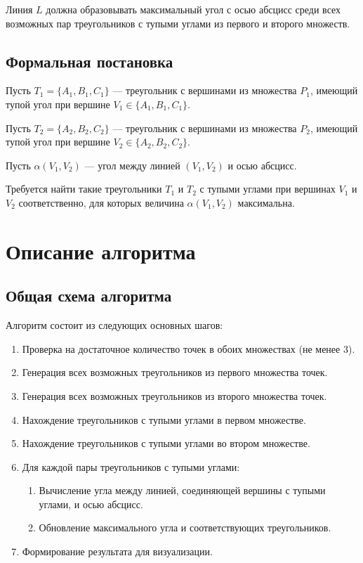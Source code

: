 \documentclass[a4paper,12pt]{article}
\begin{document}
Линия $L$ должна образовывать максимальный угол с осью абсцисс среди всех возможных пар треугольников с тупыми углами из первого и второго множеств.

\subsection{Формальная постановка}
Пусть $T_1 = \{A_1, B_1, C_1\}$ — треугольник с вершинами из множества $P_1$, имеющий тупой угол при вершине $V_1 \in \{A_1, B_1, C_1\}$.

Пусть $T_2 = \{A_2, B_2, C_2\}$ — треугольник с вершинами из множества $P_2$, имеющий тупой угол при вершине $V_2 \in \{A_2, B_2, C_2\}$.

Пусть $\alpha(V_1, V_2)$ — угол между линией $(V_1, V_2)$ и осью абсцисс.

Требуется найти такие треугольники $T_1$ и $T_2$ с тупыми углами при вершинах $V_1$ и $V_2$ соответственно, для которых величина $\alpha(V_1, V_2)$ максимальна.

\section{Описание алгоритма}

\subsection{Общая схема алгоритма}

Алгоритм состоит из следующих основных шагов:
\begin{enumerate}
    \item Проверка на достаточное количество точек в обоих множествах (не менее 3).
    \item Генерация всех возможных треугольников из первого множества точек.
    \item Генерация всех возможных треугольников из второго множества точек.
    \item Нахождение треугольников с тупыми углами в первом множестве.
    \item Нахождение треугольников с тупыми углами во втором множестве.
    \item Для каждой пары треугольников с тупыми углами:
    \begin{enumerate}
        \item Вычисление угла между линией, соединяющей вершины с тупыми углами, и осью абсцисс.
        \item Обновление максимального угла и соответствующих треугольников.
    \end{enumerate}
    \item Формирование результата для визуализации.
\end{enumerate}
\end{document}
